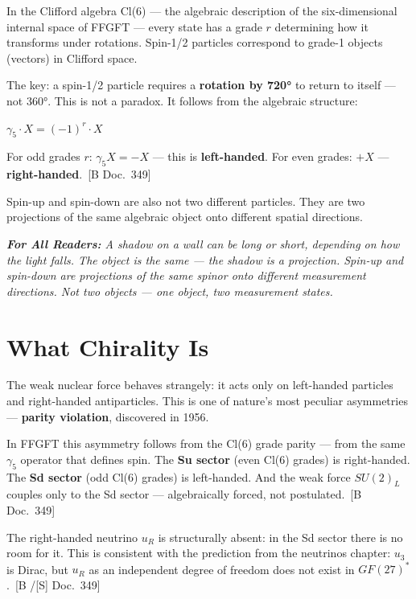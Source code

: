 \documentclass[11pt,oneside]{book}
\newcommand{\status}[1]{\penalty10000\,{\scriptsize\textcolor{gray!60}{[#1]}}}
\newenvironment{laierspur}{%
  \par\vspace{4pt}%
  \noindent\small\itshape\color{blue!60!black}%
  \textbf{For All Readers:}\enspace\ignorespaces}{%
  \par\vspace{4pt}\normalsize\normalfont\normalcolor}
\begin{document}
In the Clifford algebra Cl(6) --- the algebraic description of the
six-dimensional internal space of FFGFT --- every state has a grade $r$
determining how it transforms under rotations. Spin-1/2 particles
correspond to grade-1 objects (vectors) in Clifford space.

The key: a spin-1/2 particle requires a \textbf{rotation by 720°} to
return to itself --- not 360°. This is not a paradox. It follows from
the algebraic structure:

\begin{center}
$\gamma_5 \cdot X = (-1)^r \cdot X$
\end{center}

For odd grades $r$: $\gamma_5 X = -X$ --- this is \textbf{left-handed}.
For even grades: $+X$ --- \textbf{right-handed}. \status{B Doc.~349}

Spin-up and spin-down are also not two different particles. They are
two projections of the same algebraic object onto different spatial
directions.

\begin{laierspur}
A shadow on a wall can be long or short, depending on how the light
falls. The object is the same --- the shadow is a projection.
Spin-up and spin-down are projections of the same spinor onto different
measurement directions. Not two objects --- one object, two measurement
states.
\end{laierspur}

\section*{What Chirality Is}

The weak nuclear force behaves strangely: it acts only on left-handed
particles and right-handed antiparticles. This is one of nature's most
peculiar asymmetries --- \textbf{parity violation}, discovered in 1956.

In FFGFT this asymmetry follows from the Cl(6) grade parity --- from
the same $\gamma_5$ operator that defines spin. The \textbf{Su sector}
(even Cl(6) grades) is right-handed. The \textbf{Sd sector} (odd
Cl(6) grades) is left-handed. And the weak force $SU(2)_L$ couples
only to the Sd sector --- algebraically forced, not postulated.
\status{B Doc.~349}

The right-handed neutrino $
u_R$ is structurally absent: in the
Sd sector there is no room for it. This is consistent with the
prediction from the neutrinos chapter: $
u_3$ is Dirac, but $
u_R$
as an independent degree of freedom does not exist in $GF(27)^*$.
\status{B /[S] Doc.~349}
\end{document}
